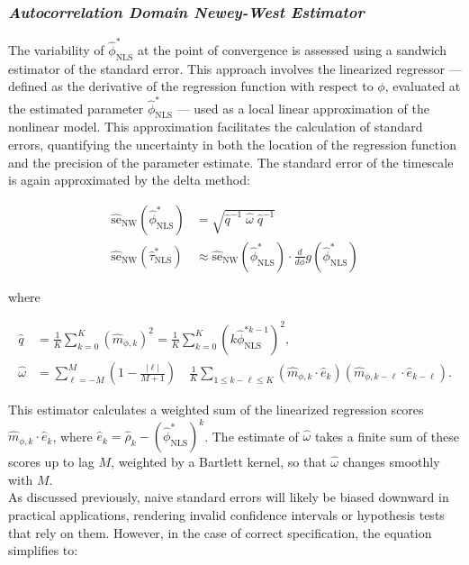 \documentclass[main.tex]{subfiles}
\begin{document}
\subsubsection{\normalfont\textit{Autocorrelation Domain Newey-West Estimator}}
The variability of $\hat\phi^*_{\scriptscriptstyle\text{NLS}}$ at the point of convergence is assessed using a sandwich estimator of the standard error. This approach involves the linearized regressor --- defined as the derivative of the regression function with respect to $\phi$, evaluated at the estimated parameter $\hat \phi^*_{\scriptscriptstyle\text{NLS}}$ --- used as a local linear approximation of the nonlinear model. This approximation facilitates the calculation of standard errors, quantifying the uncertainty in both the location of the regression function and the precision of the parameter estimate. The standard error of the timescale is again approximated by the delta method:

\begin{align}
\widehat{\text{se}}_{\text{NW}}(\hat\phi^*_{\scriptscriptstyle\text{NLS}}) &= \sqrt{\hat q^{-1}\;\hat\omega\; \hat q^{-1}}\\
\widehat{\text{se}}_{\text{NW}}(\hat\tau^*_{\scriptscriptstyle\text{NLS}}) &\approx \widehat{\text{se}}_{\text{NW}}(\hat\phi^*_{\scriptscriptstyle\text{NLS}}) \cdot \frac{d}{d\phi} g(\hat\phi^*_{\scriptscriptstyle\text{NLS}})
\end{align}

\noindent where

\begin{align}
    \hat q &= \frac{1}{K} \sum_{k=0}^K (\hat m_{\phi,k})^2 = \frac{1}{K} \sum_{k=0}^K (k \hat\phi_{\scriptscriptstyle\text{NLS}}^{*k-1})^2,\\
    \hat \omega &= \sum_{\ell=-M}^M (1 - \frac{|\ell|}{M+1}) \quad \frac{1}{K} \sum_{1 \le k - \ell \le K} (\hat m_{\phi, k} \cdot \hat e_k) (\hat m_{\phi, k-\ell} \cdot \hat e_{k-\ell}).
\end{align}

This estimator calculates a weighted sum of the linearized regression scores $\hat m_{\phi, k} \cdot \hat e_k$, where $\hat e_k = \hat\rho_k - (\hat\phi^*_{\scriptscriptstyle\text{NLS}})^k$. The estimate of $\hat\omega$ takes a finite sum of these scores up to lag $M$, weighted by a Bartlett kernel, so that $\hat\omega$ changes smoothly with $M$.\\

As discussed previously, naive standard errors will likely be biased downward in practical applications, rendering invalid confidence intervals or hypothesis tests that rely on them. However, in the case of correct specification, the equation simplifies to:
\end{document}
